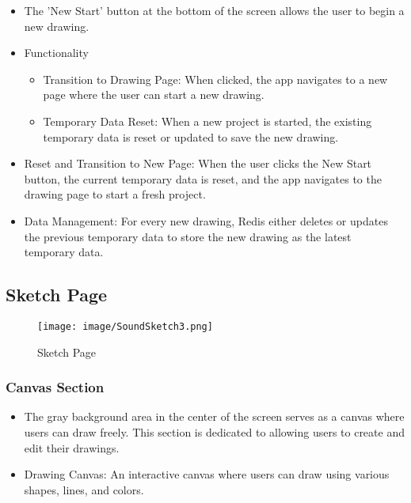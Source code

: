 \documentclass[conference]{IEEEtran}
\begin{document}
\begin{itemize}
    \item The 'New Start' button at the bottom of the screen allows the user to begin a new drawing.\\
    \item Functionality 
\begin{itemize}
    \item Transition to Drawing Page: When clicked, the app navigates to a new page where the user can start a new drawing.\\
    \item Temporary Data Reset: When a new project is started, the existing temporary data is reset or updated to save the new drawing.\\

\end{itemize}
\end{itemize}    
\begin{itemize}
    \item Reset and Transition to New Page: When the user clicks the New Start button, the current temporary data is reset, and the app navigates to the drawing page to start a fresh project.\\
    \item Data Management: For every new drawing, Redis either deletes or updates the previous temporary data to store the new drawing as the latest temporary data.\\
\end{itemize}

\subsection{Sketch Page }

\begin{figure}[h!]
    \centering
    \texttt{[image: image/SoundSketch3.png]}
    \caption{Sketch Page}
    \label{fig:enter-label}
\end{figure}

\subsubsection{Canvas Section}
\begin{itemize}
    \item The gray background area in the center of the screen serves as a canvas where users can draw freely. This section is dedicated to allowing users to create and edit their drawings.\\
    \item Drawing Canvas: An interactive canvas where users can draw using various shapes, lines, and colors.\\
\end{itemize}
\end{document}
